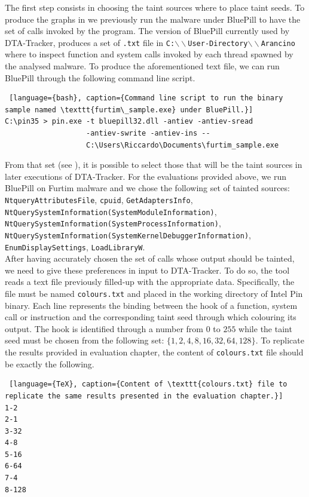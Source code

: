 \documentclass[LaM,binding=0.6cm]{sapthesis}
\begin{document}
The first step consists in choosing the taint sources where to place taint seeds. To produce the graphs in we previously run the malware under BluePill to have the set of calls invoked by the program. The version of BluePill currently used by DTA-Tracker, produces a set of \texttt{.txt} file in \texttt{C:$\backslash\backslash$User-Directory$\backslash\backslash$Arancino} where to inspect function and system calls invoked by each thread spawned by the analysed malware. To produce the aforementioned text file, we can run BluePill through the following command line script.
\begin{lstlisting} [language={bash}, caption={Command line script to run the binary sample named \texttt{furtim\_sample.exe} under BluePill.}]
C:\pin35 > pin.exe -t bluepill32.dll -antiev -antiev-sread 
				   -antiev-swrite -antiev-ins -- 
				   C:\Users\Riccardo\Documents\furtim_sample.exe
\end{lstlisting}
From that set (see ), it is possible to select those that will be the taint sources in later executions of DTA-Tracker. For the evaluations provided above, we run BluePill on Furtim malware and we chose the following set of tainted sources: \texttt{NtqueryAttributesFile}, \texttt{cpuid}, \texttt{GetAdaptersInfo}, \texttt{NtQuerySystemInforma\-tion(SystemModuleInformation)}, \texttt{NtQuerySystemInformation(SystemProc\-essInformation)}, \texttt{NtQuerySystemInformation(SystemKernelDebuggerInfo\-rmation)}, \texttt{EnumDisplaySettings}, \texttt{LoadLibraryW}.\\

After having accurately chosen the set of calls whose output should be tainted, we need to give these preferences in input to DTA-Tracker. To do so, the tool reads a text file previously filled-up with the appropriate data. Specifically, the file must be named \texttt{colours.txt} and placed in the working directory of Intel Pin binary. Each line represents the binding between the hook of a function, system call or instruction and the corresponding taint seed through which colouring its output. The hook is identified through a number from $0$ to $255$ while the taint seed must be chosen from the following set: $\{1, 2, 4, 8, 16, 32, 64, 128\}$. To replicate the results provided in evaluation chapter, the content of \texttt{colours.txt} file should be exactly the following.
\begin{lstlisting} [language={TeX}, caption={Content of \texttt{colours.txt} file to replicate the same results presented in the evaluation chapter.}]
1-2
2-1
3-32
4-8
5-16
6-64
7-4
8-128
\end{lstlisting}
\end{document}
